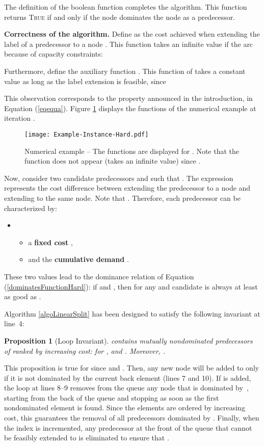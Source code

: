 \documentclass[11pt]{article}
\newtheorem{proposition}{Proposition}
\newcommand{\blue}[1]{{#1}}
\begin{document}
The definition of the boolean function  completes the algorithm. \blue{This function returns \textsc{True} if and only if the node  dominates the node  as a predecessor.}


\noindent
\textbf{Correctness of the algorithm.}
Define  as the cost achieved when extending the label of a predecessor  to a node . This function takes an infinite value if the arc  because of capacity constraints:




Furthermore, define the auxiliary function . This function of  takes a constant value as long as the label extension is feasible, since


This observation corresponds to the property announced in the introduction, in Equation (\ref{eqequa}).
Figure \ref{figure-hard} displays the functions  of the numerical example at iteration .

\begin{figure}[htbp]
\centering
\texttt{[image: Example-Instance-Hard.pdf]}
\caption{Numerical example -- The functions  are displayed for . Note that the function  does not appear (takes an infinite value) since .}
\label{figure-hard}
\end{figure}

Now, consider two candidate predecessors  and  such that . The expression
 represents the cost difference between extending the predecessor  to a node  and extending  to the same node. Note that . Therefore, each predecessor  can be characterized by:
\begin{itemize}[nosep]
\item[]
\begin{itemize}[nosep]
\item a \textbf{fixed cost} ,
\item and the \textbf{cumulative demand} .
\end{itemize}
\end{itemize}
These two values lead to the dominance relation of Equation (\ref{dominatesFunctionHard}): if  and , then  for any  and candidate  is always at least as good as .

Algorithm \ref{algoLinearSplit} has been designed to satisfy the following invariant at line~4:
\begin{proposition}[Loop Invariant]
 contains mutually nondominated predecessors of  ranked by increasing cost: for ,  and .  Moreover, .
\end{proposition}
This proposition is true for  since  and . 
Then, any new node  will be added to  only if it is not dominated by the current back element (lines 7 and 10). If  is added, the loop at lines 8--9 removes from the queue any node that is dominated by~, starting from the back of the queue and stopping as soon as the first nondominated element is found. Since the elements are ordered by increasing cost, this guarantees the removal of all predecessors dominated by . Finally, when the index  is incremented, any predecessor at the front of the queue that cannot be feasibly extended to  is eliminated to ensure that .
\end{document}
